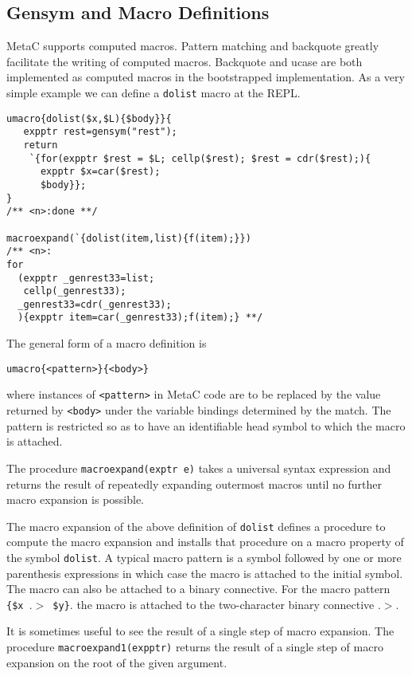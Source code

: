 \documentclass{article}
\begin{document}
\subsection{Gensym and Macro Definitions}

MetaC supports computed macros.  Pattern matching and backquote greatly facilitate the writing of computed macros.  Backquote and ucase are both implemented as computed macros in the bootstrapped implementation. As a very simple example we can define a {\tt dolist} macro at the REPL.

\begin{verbatim}
umacro{dolist($x,$L){$body}}{
   expptr rest=gensym("rest");
   return
    `{for(expptr $rest = $L; cellp($rest); $rest = cdr($rest);){
      expptr $x=car($rest);
      $body}};
}
/** <n>:done **/

macroexpand(`{dolist(item,list){f(item);}})
/** <n>:
for
  (expptr _genrest33=list;
   cellp(_genrest33);
  _genrest33=cdr(_genrest33);
  ){expptr item=car(_genrest33);f(item);} **/
\end{verbatim}

The general form of a macro definition is
\begin{verbatim}
umacro{<pattern>}{<body>}
\end{verbatim}
where instances of {\tt <pattern>} in MetaC code are to be replaced by
the value returned by {\tt <body>} under the variable bindings
determined by the match.  The pattern is restricted so as to have
an identifiable head symbol to which the macro is attached.

The procedure {\tt macroexpand(exptr e)} takes a
universal syntax expression and returns the result of repeatedly
expanding outermost macros until no further macro expansion is
possible.

The macro expansion of the above definition of {\tt dolist}
defines a procedure
to compute the macro expansion and installs that procedure on a macro
property of the symbol {\tt dolist}.  A typical macro pattern
is a symbol followed by one or more parenthesis
expressions in which case the macro is attached to the initial symbol.
The macro can also be attached to a binary connective.
For the macro pattern {\tt \{\$x $.\!>$ \$y\}}.
the macro is attached to the two-character binary connective $.\!>$.

It is sometimes useful to see the result of a single step
of macro expansion. The procedure {\tt macroexpand1(expptr)} returns
the result of a single step of macro expansion on the root of the given argument.
\end{document}
